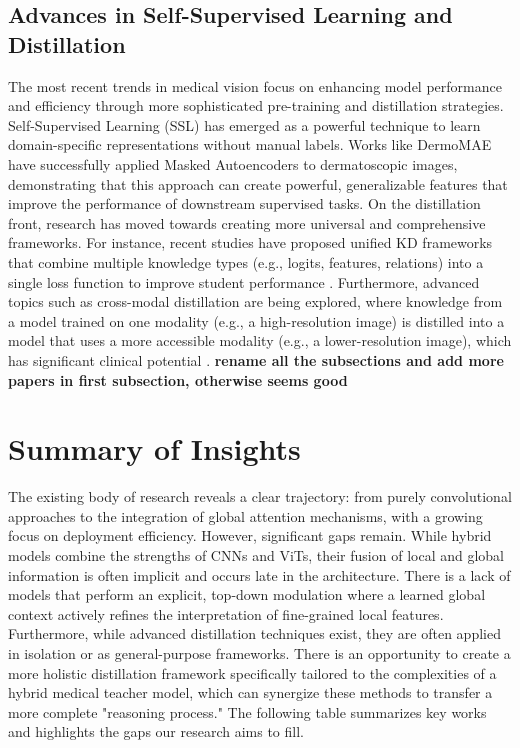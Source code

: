 \subsection{Advances in Self-Supervised Learning and Distillation}
The most recent trends in medical vision focus on enhancing model performance and efficiency through more sophisticated pre-training and distillation strategies. Self-Supervised Learning (SSL) has emerged as a powerful technique to learn domain-specific representations without manual labels. Works like DermoMAE \cite{innovator2023dermomae} have successfully applied Masked Autoencoders to dermatoscopic images, demonstrating that this approach can create powerful, generalizable features that improve the performance of downstream supervised tasks. On the distillation front, research has moved towards creating more universal and comprehensive frameworks. For instance, recent studies have proposed unified KD frameworks that combine multiple knowledge types (e.g., logits, features, relations) into a single loss function to improve student performance \cite{expert2024ukd}. Furthermore, advanced topics such as cross-modal distillation are being explored, where knowledge from a model trained on one modality (e.g., a high-resolution image) is distilled into a model that uses a more accessible modality (e.g., a lower-resolution image), which has significant clinical potential \cite{pioneer2025crossmodal}. \textbf{rename all the subsections and add more papers in first subsection, otherwise seems good}

\section{Summary of Insights}
The existing body of research reveals a clear trajectory: from purely convolutional approaches to the integration of global attention mechanisms, with a growing focus on deployment efficiency. However, significant gaps remain. While hybrid models \cite{researcher2023medformer} \cite{zagoruyko2017attention} combine the strengths of CNNs and ViTs, their fusion of local and global information is often implicit and occurs late in the architecture. There is a lack of models that perform an explicit, top-down modulation where a learned global context actively refines the interpretation of fine-grained local features. Furthermore, while advanced distillation techniques \cite{romero2014fitnets} \cite{expert2024ukd} \cite{zagoruyko2017attention} exist, they are often applied in isolation or as general-purpose frameworks. There is an opportunity to create a more holistic distillation framework specifically tailored to the complexities of a hybrid medical teacher model, which can synergize these methods to transfer a more complete "reasoning process." The following table summarizes key works and highlights the gaps our research aims to fill.


